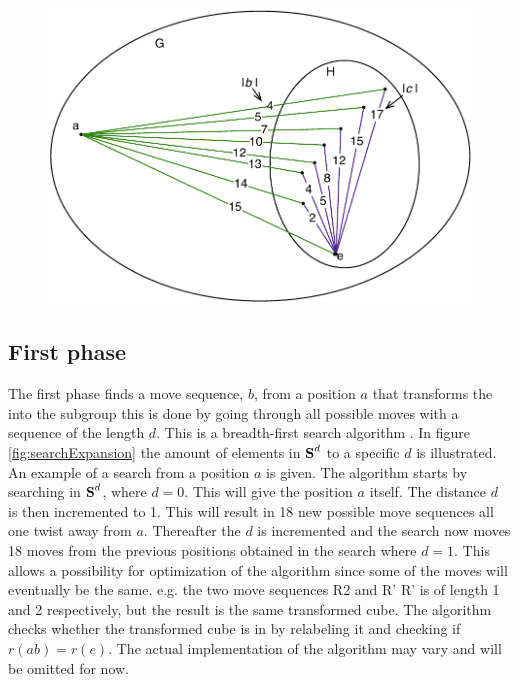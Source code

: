 \begin{figure}[!htb]
	\centering
	\includegraphics[scale=0.75]{input/pics/kocieambe2.pdf}
	\caption{}
	\label{fig:kociemba2}
\end{figure}

\subsection{First phase}
\label{sub:firstPhase}
The first phase finds a move sequence, $b$, from a position $a$ that transforms the \rubik{} into the subgroup  this is done by going through all possible moves with a sequence of the length $d$. This is a breadth-first search algorithm \cite[pp. 729-731]{Rosen07}.
In figure \ref{fig:searchExpansion} the amount of elements in $\textbf{S}^d$ to a specific $d$ is illustrated.
An example of a search from a position $a$ is given. The algorithm starts by searching in $\textbf{S}^{d}$, where $d =  0$. This will give the position $a$ itself. The distance $d$ is then incremented to 1. This will result in 18 new possible move sequences all one twist away from $a$. Thereafter the $d$ is incremented and the search now moves 18 moves from the previous positions obtained in the search where $d = 1$. This allows a possibility for optimization of the algorithm since some of the moves will eventually be the same. e.g. the two move sequences R2 and R' R' is of length 1 and 2 respectively, but the result is the same transformed cube. The algorithm checks whether the transformed cube is in  by relabeling it and checking if $r(ab) = r(e)$. The actual implementation of the algorithm may vary and will be omitted for now.

